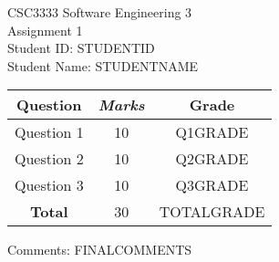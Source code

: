 \documentclass[12pt, a4paper]{article}
\begin{document}
\begin{center}
CSC3333 Software Engineering 3 \\
Assignment 1 \\
Student ID: STUDENTID \\
Student Name: STUDENTNAME \\
\vspace{5mm}

\begin{tabular}{|c|c|c|}
\hline
\textbf{Question} & \textit{Marks} & \textbf{Grade} \\ \hline
Question 1 & 10 & Q1GRADE\\ \hline
Question 2 & 10 & Q2GRADE\\ \hline
Question 3 & 10 & Q3GRADE\\ \hline \hline
\textbf{Total} & 30 & TOTALGRADE \\ \hline
\end{tabular}

\end{center}
Comments: FINALCOMMENTS
\end{document}
